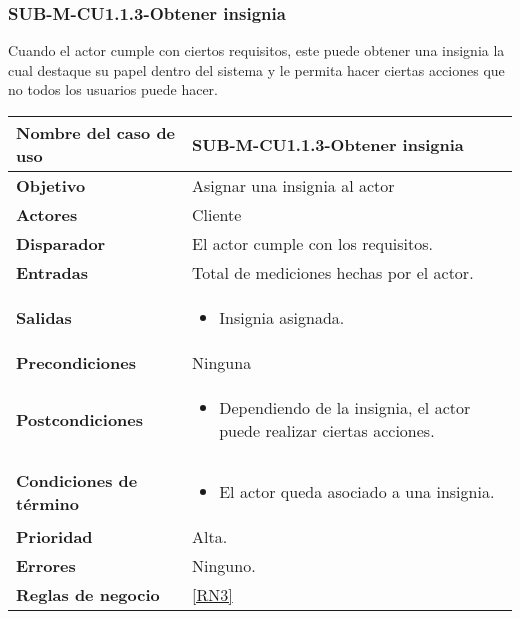 \subsubsection{SUB-M-CU1.1.3-Obtener insignia}\label{SUB-M-CU1.1.3}
Cuando el actor cumple con ciertos requisitos, este puede obtener una insignia la cual destaque su papel dentro del sistema y le permita hacer ciertas acciones que no todos los usuarios puede hacer.

\begin{longtable}{|J{5cm}|J{10.3cm}|}
	\hline
	\textbf{Nombre del caso de uso} &
		SUB-M-CU1.1.3-Obtener insignia \\ \hline
	\textbf{Objetivo} &
		Asignar una insignia al actor \\ \hline
	\textbf{Actores} &
		Cliente \\ \hline 
	\textbf{Disparador} & 
		El actor cumple con los requisitos. \\ \hline 
	\textbf{Entradas} & Total de mediciones hechas por el actor.
		\\ \hline 
	\textbf{Salidas} & 
		\begin{itemize}
			\item Insignia asignada.
		\end{itemize} \\ \hline
	\textbf{Precondiciones} & 
		Ninguna\\ \hline
	\textbf{Postcondiciones} &
		\begin{itemize}
			\item Dependiendo de la insignia, el actor puede realizar ciertas acciones.
		\end{itemize} \\ \hline
	\textbf{Condiciones de término} & 
		\begin{itemize}
			\item El actor queda asociado a una insignia.
		\end{itemize} \\ \hline 
	\textbf{Prioridad} & 
		Alta. \\ \hline
	\textbf{Errores} & Ninguno.
		\\ \hline
	\textbf{Reglas de negocio} & \ref{RN3}
		 \\ \hline
\end{longtable}

